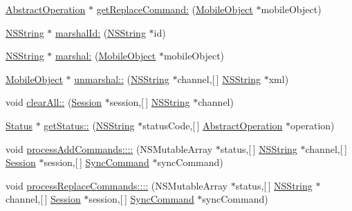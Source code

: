 \begin{DoxyCompactItemize}
\item 
\hyperlink{interface_abstract_operation}{\-Abstract\-Operation} $\ast$ \hyperlink{interface_sync_engine_aa245f581bbf066c71b1e50f66452ffd3}{get\-Replace\-Command\-:} (\hyperlink{interface_mobile_object}{\-Mobile\-Object} $\ast$mobile\-Object)
\item 
\hyperlink{class_n_s_string}{\-N\-S\-String} $\ast$ \hyperlink{interface_sync_engine_aecb9436c683f77dec55a262753a8c8fa}{marshal\-Id\-:} (\hyperlink{class_n_s_string}{\-N\-S\-String} $\ast$id)
\item 
\hyperlink{class_n_s_string}{\-N\-S\-String} $\ast$ \hyperlink{interface_sync_engine_a130a4d1d4fa66dc5903d50206cd76e6d}{marshal\-:} (\hyperlink{interface_mobile_object}{\-Mobile\-Object} $\ast$mobile\-Object)
\item 
\hyperlink{interface_mobile_object}{\-Mobile\-Object} $\ast$ \hyperlink{interface_sync_engine_adfd9a58caba17984cf91be19600472e0}{unmarshal\-::} (\hyperlink{class_n_s_string}{\-N\-S\-String} $\ast$channel,\mbox{[}$\,$\mbox{]} \hyperlink{class_n_s_string}{\-N\-S\-String} $\ast$xml)
\item 
void \hyperlink{interface_sync_engine_a7b568d278b4bc570363f2ca501ed7249}{clear\-All\-::} (\hyperlink{interface_session}{\-Session} $\ast$session,\mbox{[}$\,$\mbox{]} \hyperlink{class_n_s_string}{\-N\-S\-String} $\ast$channel)
\item 
\hyperlink{interface_status}{\-Status} $\ast$ \hyperlink{interface_sync_engine_a1bb476b1da5d75446d5e5a473c87a214}{get\-Status\-::} (\hyperlink{class_n_s_string}{\-N\-S\-String} $\ast$status\-Code,\mbox{[}$\,$\mbox{]} \hyperlink{interface_abstract_operation}{\-Abstract\-Operation} $\ast$operation)
\item 
void \hyperlink{interface_sync_engine_ae3461606440d1c189a7fc56b02047aec}{process\-Add\-Commands\-::::} (\-N\-S\-Mutable\-Array $\ast$status,\mbox{[}$\,$\mbox{]} \hyperlink{class_n_s_string}{\-N\-S\-String} $\ast$channel,\mbox{[}$\,$\mbox{]} \hyperlink{interface_session}{\-Session} $\ast$session,\mbox{[}$\,$\mbox{]} \hyperlink{interface_sync_command}{\-Sync\-Command} $\ast$sync\-Command)
\item 
void \hyperlink{interface_sync_engine_a890c76e116a39f63594f5d29273a54f8}{process\-Replace\-Commands\-::::} (\-N\-S\-Mutable\-Array $\ast$status,\mbox{[}$\,$\mbox{]} \hyperlink{class_n_s_string}{\-N\-S\-String} $\ast$channel,\mbox{[}$\,$\mbox{]} \hyperlink{interface_session}{\-Session} $\ast$session,\mbox{[}$\,$\mbox{]} \hyperlink{interface_sync_command}{\-Sync\-Command} $\ast$sync\-Command)

\end{DoxyCompactItemize}

